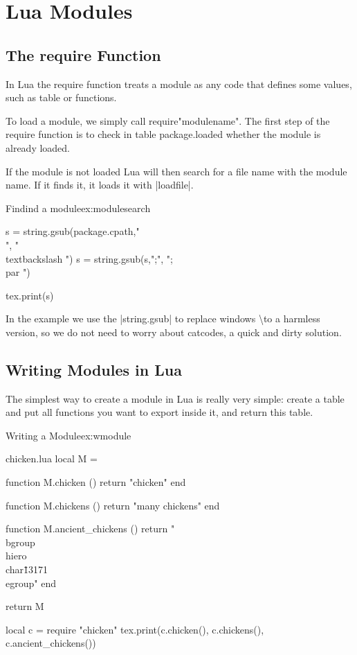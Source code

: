 \newfontfamily{}

\chapter{Lua Modules}

\section{The require Function}

In Lua the require function treats a module as any code that defines some values, such as table or functions. 

To load  a module, we simply call require"modulename". The first step of the require function is to check in table package.loaded whether the module is already loaded.

If the module is not loaded Lua will then search for a file name with the module name. If it finds it, it loads it with |loadfile|. 


\begin{texexample}{Findind a module}{ex:modulesearch}
\begin{luacode*}
s = string.gsub(package.cpath,"\\", "\\textbackslash ")
s = string.gsub(s,";", ";\\par ")

tex.print(s)
\end{luacode*}
\end{texexample}

In the example we use the |string.gsub| to replace windows \textbackslash to a harmless version, so we do not need to worry about catcodes, a quick and dirty solution. 

\section{Writing Modules in Lua}

The simplest way to create a module in Lua is really very simple: create a table and put all functions you want to export inside it, and return this table.

\begin{texexample}{Writing a Module}{ex:wmodule}
\begin{filecontents*}{chicken.lua}
local M = {}

function M.chicken ()
  return "chicken"
end

function M.chickens ()
  return "many chickens" 
end

function M.ancient_chickens ()
  return "\\bgroup\\hiero\\char\"13171 \\egroup"
end

return M
\end{filecontents*}

\begin{luacode*}
local c = require "chicken"
      tex.print(c.chicken(), c.chickens(), c.ancient_chickens())
\end{luacode*}
\end{texexample}

